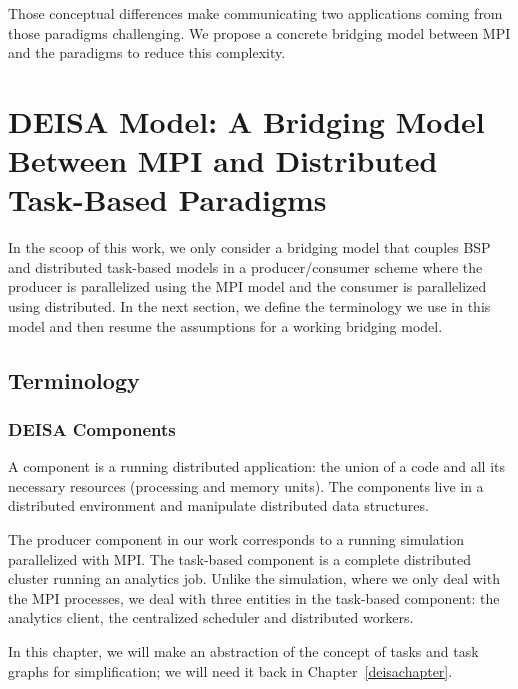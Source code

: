 Those conceptual differences make communicating two applications coming from those paradigms challenging. We propose a concrete bridging model between MPI and the \dask paradigms to reduce this complexity.


\section{DEISA Model: A Bridging Model Between MPI and \dask Distributed Task-Based Paradigms}\label{sec:bsp2dtb}
In the scoop of this work, we only consider a bridging model that couples BSP and distributed task-based models in a producer/consumer scheme where the producer is parallelized using the MPI model and the consumer is parallelized using \dask distributed. In the next section, we define the terminology we use in this model and then resume the assumptions for a working bridging model. 

\subsection{Terminology}

\subsubsection{DEISA Components}\label{sec:btp:actor}
A \deisa component is a running distributed application: the union of a code and all its necessary resources (processing and memory units). The components live in a distributed environment and manipulate distributed data structures.  

The producer component in our work corresponds to a running simulation parallelized with MPI.
The task-based component is a complete \dask distributed cluster running an analytics job. Unlike the simulation, where we only deal with the MPI processes, we deal with three entities in the task-based component: the analytics client, the centralized scheduler and distributed workers. 

In this chapter, we will make an abstraction of the concept of \deisa tasks and \deisa task graphs for simplification; we will need it back in Chapter~\ref{deisachapter}. 


